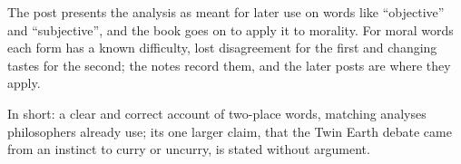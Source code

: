\begin{afterword}
The post presents the analysis as meant for later use on words like ``objective'' and ``subjective'', and the book goes on to apply it to morality. For moral words each form has a known difficulty, lost disagreement for the first and changing tastes for the second; the notes record them, and the later posts are where they apply.

In short: a clear and correct account of two-place words, matching analyses philosophers already use; its one larger claim, that the Twin Earth debate came from an instinct to curry or uncurry, is stated without argument.
\end{afterword}
